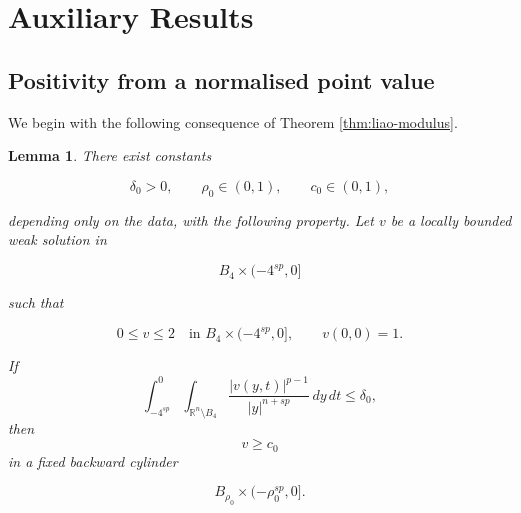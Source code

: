 \documentclass[10pt]{amsart}
\theoremstyle{plain}
\newtheorem{lemma}{Lemma}[section]
\theoremstyle{definition}
\theoremstyle{remark}
\numberwithin{equation}{section}
\newcommand{\R}{\mathbb R}
\begin{document}
\section{Auxiliary Results}

\subsection{Positivity from a normalised point value}

We begin with the following consequence of Theorem
\ref{thm:liao-modulus}. 

\begin{lemma}\label{lem:continuity}
There exist constants

\[
    \delta_0>0,
    \qquad
    \rho_0\in(0,1),
    \qquad
    c_0\in(0,1),
\]

depending only on the data, with the following property. Let $v$ be a locally
bounded weak solution in

\[
    B_4\times(-4^{sp},0]
\]

such that

\[
    0\le v\le2
    \quad\text{in }B_4\times(-4^{sp},0],
    \qquad
    v(0,0)=1.
\]

If
\begin{equation}\label{eq:normalized-tail-small}
\int_{-4^{sp}}^0
\int_{\R^n\setminus B_4}
\frac{|v(y,t)|^{p-1}}{|y|^{n+sp}}\,dy\,dt
\le\delta_0,
\end{equation}
then
\begin{equation}\label{eq:normalized-positive}
v\ge c_0
\end{equation}
in a fixed backward cylinder

\[
    B_{\rho_0}\times(-\rho_0^{sp},0].
\]

\end{lemma}
\end{document}
